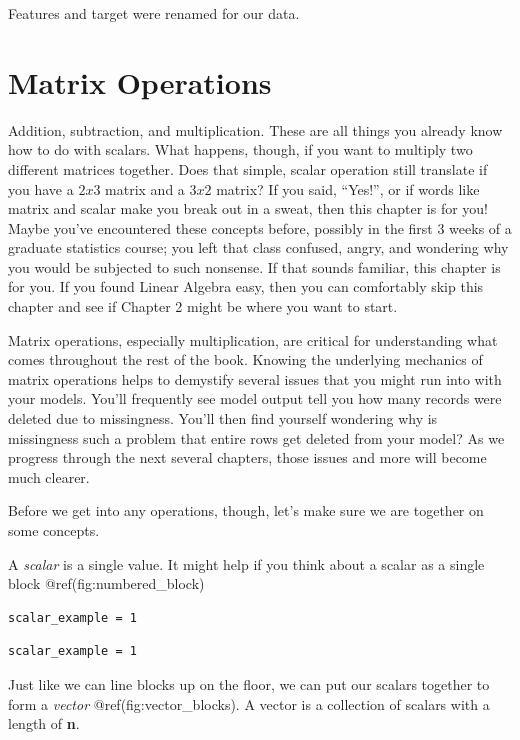 \documentclass[
  letterpaper,
]{krantz}
\begin{document}
Features and target were renamed for our data.

\chapter{Matrix Operations}\label{sec-matrix-operations}

Addition, subtraction, and multiplication. These are all things you
already know how to do with scalars. What happens, though, if you want
to multiply two different matrices together. Does that simple, scalar
operation still translate if you have a \(2x3\) matrix and a \(3x2\)
matrix? If you said, ``Yes!'', or if words like matrix and scalar make
you break out in a sweat, then this chapter is for you! Maybe you've
encountered these concepts before, possibly in the first 3 weeks of a
graduate statistics course; you left that class confused, angry, and
wondering why you would be subjected to such nonsense. If that sounds
familiar, this chapter is for you. If you found Linear Algebra easy,
then you can comfortably skip this chapter and see if Chapter 2 might be
where you want to start.

Matrix operations, especially multiplication, are critical for
understanding what comes throughout the rest of the book. Knowing the
underlying mechanics of matrix operations helps to demystify several
issues that you might run into with your models. You'll frequently see
model output tell you how many records were deleted due to missingness.
You'll then find yourself wondering why is missingness such a problem
that entire rows get deleted from your model? As we progress through the
next several chapters, those issues and more will become much clearer.

Before we get into any operations, though, let's make sure we are
together on some concepts.

A \emph{scalar} is a single value. It might help if you think about a
scalar as a single block @ref(fig:numbered\_block)

\begin{verbatim}
scalar_example = 1
\end{verbatim}

\begin{verbatim}
scalar_example = 1
\end{verbatim}

Just like we can line blocks up on the floor, we can put our scalars
together to form a \emph{vector} @ref(fig:vector\_blocks). A vector is a
collection of scalars with a length of \textbf{n}.
\end{document}
